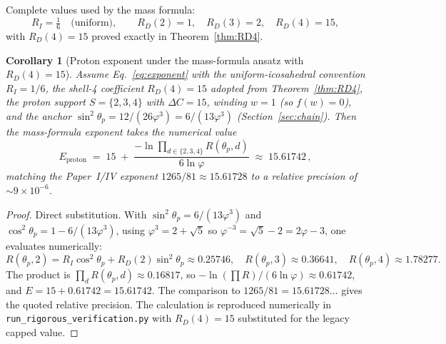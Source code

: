 \documentclass[12pt]{article}
\newtheorem{corollary}[theorem]{Corollary}
\newcommand{\phig}{\varphi}
\begin{document}
Complete values used by the mass formula:
\[
R_I = \tfrac{1}{6} \quad \text{(uniform)}, \qquad R_D(2) = 1, \quad R_D(3) = 2, \quad R_D(4) = 15,
\]
with $R_D(4) = 15$ proved exactly in Theorem~\ref{thm:RD4}.

\begin{corollary}[Proton exponent under the mass-formula ansatz with $R_D(4) = 15$]\label{cor:proton}
Assume Eq.~\eqref{eq:exponent} with the uniform-icosahedral convention $R_I = 1/6$, the shell-4 coefficient $R_D(4) = 15$ adopted from Theorem~\ref{thm:RD4}, the proton support $S = \{2, 3, 4\}$ with $\Delta C = 15$, winding $w = 1$ (so $f(w) = 0$), and the anchor $\sin^2\theta_p = 12/(26 \phig^3) = 6/(13 \phig^3)$ (Section~\ref{sec:chain}). Then the mass-formula exponent takes the numerical value
\[
E_{\mathrm{proton}} \;=\; 15 \;+\; \frac{-\ln \prod_{d \in \{2,3,4\}} R(\theta_p, d)}{6 \ln \phig} \;\approx\; 15.61742\,,
\]
matching the Paper~I/IV exponent $1265/81 \approx 15.61728$ to a relative precision of $\sim 9 \times 10^{-6}$.
\end{corollary}

\begin{proof}
Direct substitution. With $\sin^2\theta_p = 6/(13 \phig^3)$ and $\cos^2\theta_p = 1 - 6/(13 \phig^3)$, using $\phig^3 = 2 + \sqrt{5}$ so $\phig^{-3} = \sqrt{5} - 2 = 2\phig - 3$, one evaluates numerically:
\[
R(\theta_p, 2) = R_I \cos^2\theta_p + R_D(2) \sin^2\theta_p \approx 0.25746, \quad R(\theta_p, 3) \approx 0.36641, \quad R(\theta_p, 4) \approx 1.78277.
\]
The product is $\prod_d R(\theta_p, d) \approx 0.16817$, so $-\ln(\prod R) / (6 \ln \phig) \approx 0.61742$, and $E = 15 + 0.61742 = 15.61742$. The comparison to $1265/81 = 15.61728\ldots$ gives the quoted relative precision. The calculation is reproduced numerically in \texttt{run\_rigorous\_verification.py} with $R_D(4) = 15$ substituted for the legacy capped value.
\end{proof}
\end{document}
